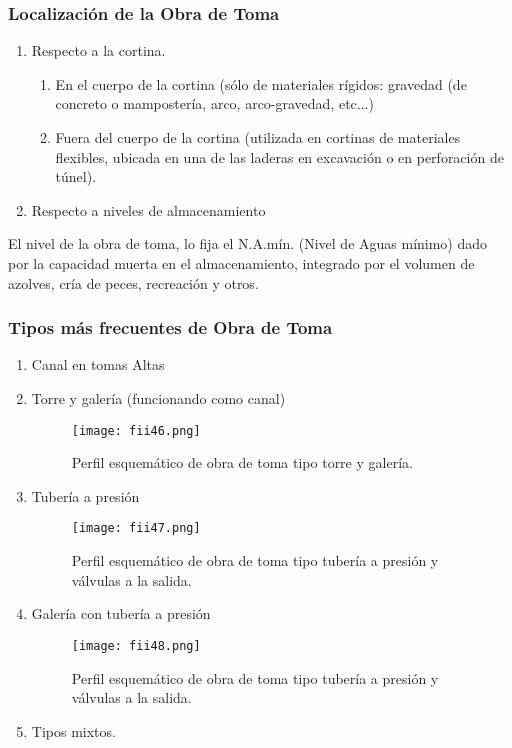 \subsubsection{Localización de la Obra de Toma}

\begin{enumerate}
	\item Respecto a la cortina.
	      \begin{enumerate}
		      \item En el cuerpo de la cortina (sólo de materiales rígidos: gravedad (de concreto
		            o mampostería, arco, arco-gravedad, etc$\dots$)
		      \item Fuera del cuerpo de la cortina (utilizada en cortinas de materiales flexibles,
		            ubicada en una de las laderas en excavación o en perforación de túnel).
	      \end{enumerate}
	\item Respecto a niveles de almacenamiento
\end{enumerate}

El nivel de la obra de toma, lo fija el N.A.mín. (Nivel de Aguas mínimo) dado por
la capacidad muerta en el almacenamiento, integrado por el volumen de azolves, cría
de peces, recreación y otros.

\subsubsection{Tipos más frecuentes de Obra de Toma}

\begin{enumerate}[noitemsep]
	\item Canal en tomas Altas
	\item Torre y galería (funcionando como canal)
	      \begin{figure}[h!]
		      \centerline{\texttt{[image: fii46.png]}}
		      \caption{Perfil esquemático de obra de toma tipo torre y galería.}
		      \label{fii46}
	      \end{figure}
	\item Tubería a presión
	      \begin{figure}[h!]
		      \centerline{\texttt{[image: fii47.png]}}
		      \caption{Perfil esquemático de obra de toma tipo tubería a presión y válvulas a
			      la salida.}
	      \end{figure}
	      \label{fii47}
	\item Galería con tubería a presión
	      \begin{figure}[h!]
		      \centerline{\texttt{[image: fii48.png]}}
		      \caption{Perfil esquemático de obra de toma tipo tubería a presión y válvulas a
			      la salida.}
		      \label{fii48}
	      \end{figure}
	\item Tipos mixtos.
\end{enumerate}

